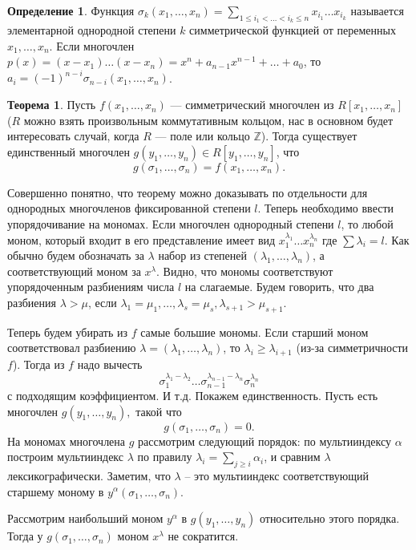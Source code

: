 \documentclass[10pt,a4paper,oneside]{book}
\theoremstyle{definition}
\newtheorem*{defn}{{\color{yellow!30!red} Определение}}
\newtheorem{thm}{{\color{red!40!black} Теорема}}
\newcommand{\mb}[1]{\mathbb{#1}}
\begin{document}
\begin{defn}
Функция $\sigma_k(x_1,\dots, x_n)= \sum_{1\leq i_1<\dots<i_k\leq n}x_{i_1}\dots x_{i_k}$ называется элементарной однородной степени $k$ симметрической функцией от переменных $x_1,\dots, x_n$. Если многочлен $p(x)=(x-x_1)\dots(x-x_n)=x^n+a_{n-1}x^{n-1}+\dots+a_0$, то $a_i=(-1)^{n-i}\sigma_{n-i}(x_1,\dots, x_n)$.
\end{defn}

\begin{thm} Пусть $f(x_1,\dots, x_n)$ --- симметрический многочлен из $R[x_1,\dots, x_n]$ ($R$ можно взять произвольным коммутативным кольцом, нас в основном будет интересовать случай, когда $R$ --- поле или кольцо $\mb Z$). Тогда существует единственный многочлен $g(y_1, \dots, y_n)\in R[y_1,\dots, y_n]$, что  $$g(\sigma_1, \dots, \sigma_n)=f(x_1, \dots, x_n).$$
\end{thm}
\proof
Совершенно понятно, что теорему можно доказывать по отдельности для однородных многочленов фиксированной степени $l$. Теперь необходимо ввести упорядочивание на мономах. Если многочлен однородный степени $l$, то любой моном, который входит в его представление имеет вид $x_1^{\lambda_1}\dots x_n^{\lambda_n}$ где $\sum \lambda_i = l$. Как обычно будем обозначать за $\lambda$ набор из степеней $(\lambda_1,\dots,\lambda_n)$, а соответствующий моном за $x^{\lambda}$. Видно, что мономы соответствуют упорядоченным разбиениям числа $l$ на слагаемые. Будем говорить, что два разбиения $\lambda>\mu$, если $\lambda_1=\mu_1,\dots, \lambda_s=\mu_s, \lambda_{s+1}>\mu_{s+1}$.

Теперь будем убирать из $f$ самые большие мономы. Если старший моном соответствовал разбиению $\lambda=(\lambda_1,\dots,\lambda_n)$, то $\lambda_i\geq \lambda_{i+1}$ (из-за симметричности $f$). Тогда из $f$ надо вычесть 
$$\sigma_1^{\lambda_1-\lambda_2}\dots \sigma_{n-1}^{\lambda_{n-1}-\lambda_n}\sigma_n^{\lambda_n}$$
с подходящим коэффициентом. И т.д. Покажем единственность. Пусть есть многочлен 
$g(y_1,\dots,y_n),$ такой что $$g(\sigma_1,\dots,\sigma_n)=0.$$
На мономах многочлена $g$ рассмотрим следующий порядок: по мультииндексу $\alpha$ построим мультииндекс $\lambda$ по правилу $\lambda_i=\sum_{j\geq i} \alpha_i$, и сравним $\lambda$ лексикографически. Заметим, что $\lambda$ -- это мультииндекс соответствующий старшему моному в $y^{\alpha}(\sigma_1,\dots,\sigma_n)$. 
 
Рассмотрим наибольший моном $y^{\alpha}$ в $g(y_1,\dots,y_n)$ относительно этого порядка. Тогда у $g(\sigma_1,\dots,\sigma_n)$ моном $x^{\lambda}$ не сократится.
\endproof
\end{document}
